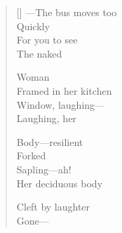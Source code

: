 \label{ch:there}
\settowidth{\versewidth}{               —The bus moves too}
\begin{verse}[\versewidth]
\hspace*{2\vgap} ---The bus moves too\\
Quickly\\
For you to see\\
The naked

Woman\\
Framed in her kitchen\\
Window, laughing---\\
Laughing, her

Body---resilient\\
Forked\\
Sapling---ah!\\
Her deciduous body

Cleft by laughter\\
Gone---
\end{verse}
